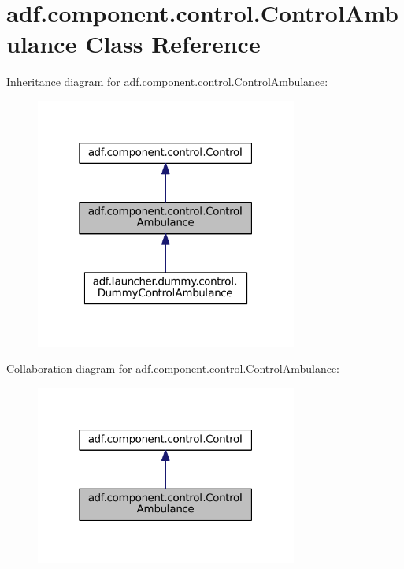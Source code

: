 \hypertarget{classadf_1_1component_1_1control_1_1ControlAmbulance}{}\section{adf.\+component.\+control.\+Control\+Ambulance Class Reference}
\label{classadf_1_1component_1_1control_1_1ControlAmbulance}


Inheritance diagram for adf.\+component.\+control.\+Control\+Ambulance\+:
\nopagebreak
\begin{figure}[H]
\begin{center}
\leavevmode
\includegraphics[width=244pt]{classadf_1_1component_1_1control_1_1ControlAmbulance__inherit__graph}
\end{center}
\end{figure}


Collaboration diagram for adf.\+component.\+control.\+Control\+Ambulance\+:
\nopagebreak
\begin{figure}[H]
\begin{center}
\leavevmode
\includegraphics[width=244pt]{classadf_1_1component_1_1control_1_1ControlAmbulance__coll__graph}
\end{center}
\end{figure}
